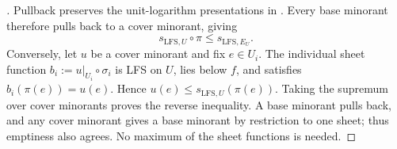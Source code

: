 \begin{proof}[]
Pullback preserves the unit-logarithm presentations in
\cite[\S7.9]{GJR26}. Every base minorant therefore pulls back to a cover
minorant, giving
\begin{equation}
\label{eq:p031-lfs-envelope-easy-inequality}
 s_{\mathrm{LFS},U}\circ\pi\leq s_{\mathrm{LFS},E_U}.
\end{equation}
Conversely, let $u$ be a cover minorant and fix $e\in U_i$. The individual
sheet function $b_i:=u|_{U_i}\circ\sigma_i$ is LFS on $U$, lies below
$f$, and satisfies $b_i(\pi(e))=u(e)$. Hence
$u(e)\leq s_{\mathrm{LFS},U}(\pi(e))$. Taking the supremum over cover
minorants proves the reverse inequality. A base minorant pulls back,
and any cover minorant gives a base minorant by restriction to one sheet;
thus emptiness also agrees. No maximum of the sheet functions is needed.
\end{proof}
